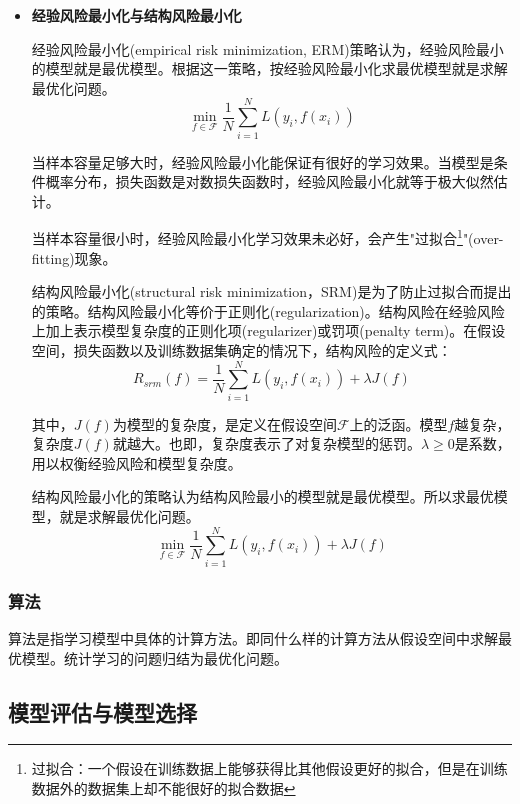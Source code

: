 \begin{itemize}
    \item \textbf{经验风险最小化与结构风险最小化} 
    
    经验风险最小化(empirical risk minimization, ERM)策略认为，经验风险最小的模型就是最优模型。根据这一策略，按经验风险最小化求最优模型就是求解最优化问题。
    \begin{equation}
        \underset{f\in \mathcal{F}}{\min} \frac{1}{N}\sum_{i=1}^{N} L(y_i,f(x_i))
    \end{equation}

    当样本容量足够大时，经验风险最小化能保证有很好的学习效果。当模型是条件概率分布，损失函数是对数损失函数时，经验风险最小化就等于极大似然估计。

    当样本容量很小时，经验风险最小化学习效果未必好，会产生"过拟合\footnote{过拟合：一个假设在训练数据上能够获得比其他假设更好的拟合，但是在训练数据外的数据集上却不能很好的拟合数据}"(over-fitting)现象。

    结构风险最小化(structural risk minimization，SRM)是为了防止过拟合而提出的策略。结构风险最小化等价于正则化(regularization)。结构风险在经验风险上加上表示模型复杂度的正则化项(regularizer)或罚项(penalty term)。在假设空间，损失函数以及训练数据集确定的情况下，结构风险的定义式：
    \begin{equation}
        R_{srm}(f)=\frac{1}{N}\sum_{i=1}^{N}L(y_i,f(x_i))+\lambda J(f)
    \end{equation}

    其中，$J(f)$为模型的复杂度，是定义在假设空间$\mathcal{F}$上的泛函。模型$f$越复杂，复杂度$J(f)$就越大。也即，复杂度表示了对复杂模型的惩罚。$\lambda \geq 0$是系数，用以权衡经验风险和模型复杂度。

    结构风险最小化的策略认为结构风险最小的模型就是最优模型。所以求最优模型，就是求解最优化问题。
    \begin{equation}
        \underset{f\in \mathcal{F}}{\min}  \frac{1}{N}\sum_{i=1}^{N}L(y_i,f(x_i))+\lambda J(f)
    \end{equation}
    
\end{itemize}

\subsubsection{算法}
算法是指学习模型中具体的计算方法。即同什么样的计算方法从假设空间中求解最优模型。统计学习的问题归结为最优化问题。

\subsection{模型评估与模型选择}
